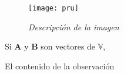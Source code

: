 \documentclass[11pt,fleqn]{book} %
\begin{document}
	\begin{figure}[h!]
		\centering
		\texttt{[image: pru]}
		\caption{\emph{Descripci\'on de la imagen}}
		\label{fig:0Subvect}
	\end{figure}



\begin{theorem}
Si $  \mathbf{A} $ y  $\mathbf{B}$ son vectores de $\mathbb{V}$,
\end{theorem}
%

\begin{obs}
 El contenido de la observaci\'on
\end{obs}






\cleardoublepage
\setlength{\columnsep}{0.75cm}
\printindex
\end{document}
